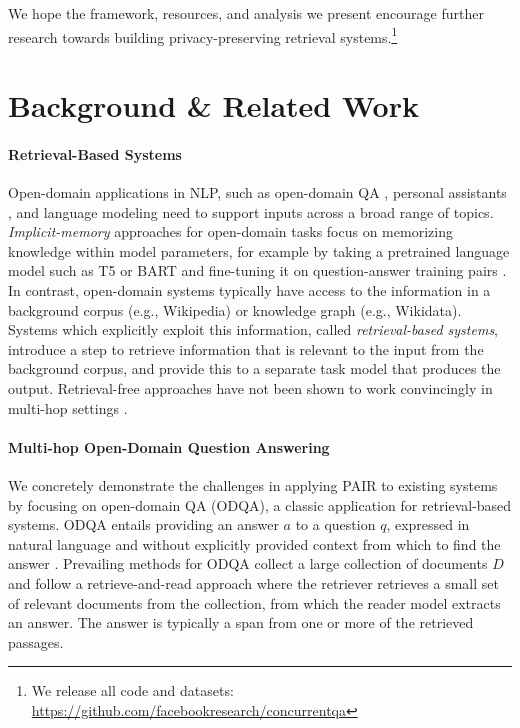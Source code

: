 \documentclass{article}
\renewcommand\cite{\citep}	\newcommand\shortcite{\citeyearpar}\newcommand\newcite{\citet}
\newcommand{\problemshortname}{\textsc{PAIR}\xspace}
\begin{document}
We hope the framework, resources, and analysis we present encourage further research towards building privacy-preserving retrieval systems.\footnote{We release all code and datasets: \url{https://github.com/facebookresearch/concurrentqa}}
 
\section{Background \& Related Work}

\label{sec:background}
\paragraph{Retrieval-Based Systems}
Open-domain applications in NLP, such as open-domain QA \cite{voorhees1999trec,chen2017retrieveread}, personal assistants \cite{dinan2019wow}, and language modeling \cite{borgeaud2021retro} need to support inputs across a broad range of topics.
\textit{Implicit-memory} approaches for open-domain tasks focus on memorizing knowledge within model parameters, for example by taking a pretrained language model such as T5 or BART and fine-tuning it on question-answer training pairs \cite{roberts2020t5}. 
In contrast, open-domain systems typically have access to the information in a background corpus (e.g., Wikipedia) or knowledge graph (e.g., Wikidata). Systems which explicitly exploit this information, called \textit{retrieval-based systems}, introduce a step to retrieve information that is relevant to the input from the background corpus, and provide this to a separate task model that produces the output. Retrieval-free approaches have not been shown to work convincingly in multi-hop settings \cite{xiong2021mdr}.

\paragraph{Multi-hop Open-Domain Question Answering}
We concretely demonstrate the challenges in applying \problemshortname to existing systems by focusing on open-domain QA (ODQA), a classic application for retrieval-based systems. ODQA entails providing an answer $a$ to a  question $q$, expressed in natural language and without explicitly provided context from which to find the answer \cite{voorhees1999trec}. Prevailing methods for ODQA collect a large collection of documents $D$ and follow a retrieve-and-read approach \cite[][inter alia.]{chen2017retrieveread} where the retriever retrieves a small set of relevant documents from the collection, from which the reader model extracts an answer. The answer is typically a span from one or more of the retrieved passages.
\end{document}
